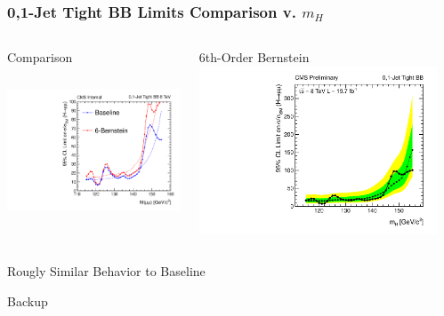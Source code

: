 \documentclass{beamer}
\begin{document}
\begin{frame}
\frametitle{0,1-Jet Tight BB Limits Comparison v. $m_H$}
  \vspace{-1em}
  \begin{columns}[c]
   \column{60mm}
      \begin{center}
        Comparison\\
        \includegraphics[height=50mm]{redoWholeRange/limitComparison/limits_CompareExpLog.pdf}
      \end{center}
   \column{60mm}
      \begin{center}
        6th-Order Bernstein
        \includegraphics[height=50mm]{redoWholeRange/TightBB6BernResults/Jets01PassPtG10BB_8TeV.pdf}
      \end{center}
  \end{columns}
\begin{center}
  Rougly Similar Behavior to Baseline
\end{center}
\end{frame}


\begin{frame}
  \begin{center}
    \Huge
    Backup
  \end{center}
\end{frame}

\end{document}
